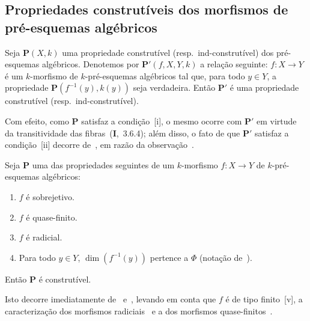 \subsection{Propriedades construtíveis dos morfismos de pré-esquemas algébricos}
\label{subsection:IV.9.3}

\begin{proposition}[9.3.1]
\label{IV.9.3.1}
Seja $\mathbf{P}(X,k)$ uma propriedade construtível \textnormal{(}resp.\ ind-construtível\textnormal{)} dos pré-esquemas algébricos.
Denotemos por $\mathbf{P}'(f,X,Y,k)$ a relação seguinte: $f:X\to Y$ é um $k$-morfismo de $k$-pré-esquemas algébricos tal que, para todo $y\in Y$, a propriedade $\mathbf{P}(f^{-1}(y),k(y))$ seja verdadeira.
Então $\mathbf{P}'$ é uma propriedade construtível \textnormal{(}resp.\ ind-construtível\textnormal{)}.
\end{proposition}

Com efeito, como $\mathbf{P}$ satisfaz a condição~[i], o mesmo ocorre com $\mathbf{P}'$ em virtude da transitividade das fibras~(\textbf{I},~3.6.4); além disso, o fato de que $\mathbf{P}'$ satisfaz a condição~[ii] decorre de~, em razão da observação~.

\begin{proposition}[9.3.2]
\label{IV.9.3.2}
Seja $\mathbf{P}$ uma das propriedades seguintes de um $k$-morfismo $f:X\to Y$ de $k$-pré-esquemas algébricos:
\begin{enumerate}[label=(\roman*)]
  \item $f$ é sobrejetivo.
  \item $f$ é quase-finito.
  \item $f$ é radicial.
  \item Para todo $y\in Y$, $\dim(f^{-1}(y))$ pertence a $\Phi$ \textnormal{(}notação de~\textnormal{)}.
\end{enumerate}
Então $\mathbf{P}$ é construtível.
\end{proposition}

Isto decorre imediatamente de~ e~, levando em conta que $f$ é de tipo finito~[v], a caracterização dos morfismos radiciais~ e a dos morfismos quase-finitos~.

